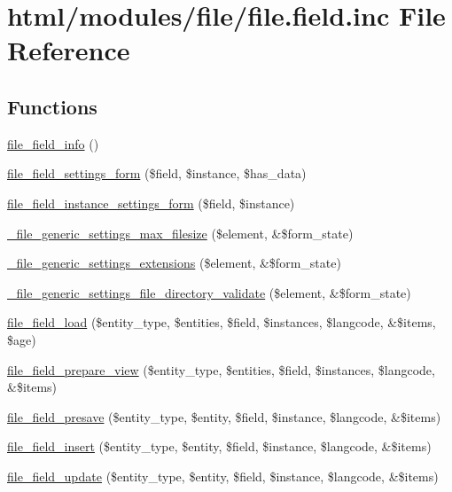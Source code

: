 \hypertarget{file_8field_8inc}{
\section{html/modules/file/file.field.inc File Reference}
\label{file_8field_8inc}
}
\subsection*{Functions}
\begin{DoxyCompactItemize}
\item 
\hyperlink{file_8field_8inc_a58982edb906e7c17a5233247ccb712c0}{file\_\-field\_\-info} ()
\item 
\hyperlink{file_8field_8inc_a2915708649a20075b3176a21758b7221}{file\_\-field\_\-settings\_\-form} (\$field, \$instance, \$has\_\-data)
\item 
\hyperlink{file_8field_8inc_af5fb6a3103be10a56bcad48b6bfadfc6}{file\_\-field\_\-instance\_\-settings\_\-form} (\$field, \$instance)
\item 
\hyperlink{file_8field_8inc_a202df25868194246cdeeef039fb5d064}{\_\-file\_\-generic\_\-settings\_\-max\_\-filesize} (\$element, \&\$form\_\-state)
\item 
\hyperlink{file_8field_8inc_a52e831776a1bcbb9b97a254a3e4795c7}{\_\-file\_\-generic\_\-settings\_\-extensions} (\$element, \&\$form\_\-state)
\item 
\hyperlink{file_8field_8inc_a053a6e2224eda84a0b92ee43fc761ec0}{\_\-file\_\-generic\_\-settings\_\-file\_\-directory\_\-validate} (\$element, \&\$form\_\-state)
\item 
\hyperlink{file_8field_8inc_a003cceddcd9032c60a076b0bfd283cb5}{file\_\-field\_\-load} (\$entity\_\-type, \$entities, \$field, \$instances, \$langcode, \&\$items, \$age)
\item 
\hyperlink{file_8field_8inc_a78730e381ae185f44420da98c5b530de}{file\_\-field\_\-prepare\_\-view} (\$entity\_\-type, \$entities, \$field, \$instances, \$langcode, \&\$items)
\item 
\hyperlink{file_8field_8inc_ad4ad3922256c92b72c48126e4a3794e9}{file\_\-field\_\-presave} (\$entity\_\-type, \$entity, \$field, \$instance, \$langcode, \&\$items)
\item 
\hyperlink{file_8field_8inc_a86f10a6835cfef9dadc90a936290757d}{file\_\-field\_\-insert} (\$entity\_\-type, \$entity, \$field, \$instance, \$langcode, \&\$items)
\item 
\hyperlink{file_8field_8inc_a3666017c649e6c46c6582d871355da2d}{file\_\-field\_\-update} (\$entity\_\-type, \$entity, \$field, \$instance, \$langcode, \&\$items)

\end{DoxyCompactItemize}
